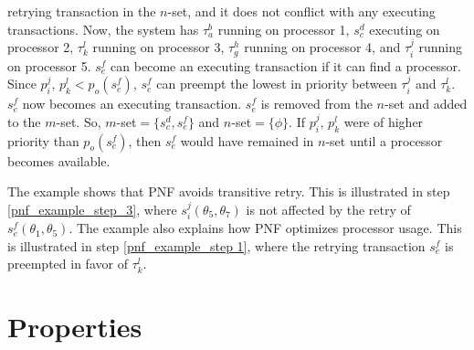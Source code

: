 \documentclass[12pt,english]{report}
\begin{document}
\begin{compactenum}
retrying transaction in the $n$-set, and it does not conflict with
any executing transactions. Now, the system has $\tau_{a}^{b}$ running
on processor 1, $s_{c}^{d}$ executing on processor 2, $\tau_{k}^{l}$
running on processor 3, $\tau_{g}^{h}$ running on processor 4, and
$\tau_{i}^{j}$ running on processor 5. $s_{e}^{f}$ can become an
executing transaction if it can find a processor. 
%
Since $p_{i}^{j},\, p_{k}^{l}<p_{o}(s_{e}^{f})$,
$s_{e}^{f}$ can preempt the lowest in priority between $\tau_{i}^{j}$
and $\tau_{k}^{l}$. $s_{e}^{f}$ now becomes an executing transaction.
$s_{e}^{f}$ is removed from the $n$-set and added to the $m$-set.
So, $m$-set$=\{s_{c}^{d},s_{e}^{f}\}$ and $n$-set$=\{\phi\}$. If $p_{i}^{j},\, p_{k}^{l}$
were of higher priority than $p_{o}(s_{e}^{f})$, then $s_{e}^{f}$
would have remained in $n$-set until a processor becomes available.
%
\end{compactenum}
The  example shows that PNF avoids transitive retry. This is illustrated in step \ref{pnf_example_step_3}, where $s_{i}^{j}(\theta_{5},\theta_{7})$ is not affected by the  retry of $s_{e}^{f}(\theta_{1},\theta_{5})$. The example also explains how
PNF optimizes processor usage. This is illustrated in step \ref{pnf_example_step 1}, 
where the retrying transaction $s_{e}^{f}$ is preempted in favor of $\tau_{k}^{l}$.


\section{Properties\label{pnf properties sec}}
\end{document}
